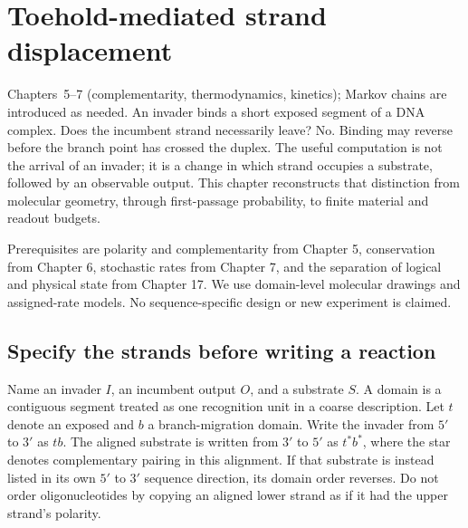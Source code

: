 \chapter{Toehold-mediated strand displacement}
{Chapters~5--7 (complementarity, thermodynamics, kinetics); Markov chains are introduced as needed.}
An invader binds a short exposed segment of a DNA complex. Does the incumbent
strand necessarily leave? No. Binding may reverse before the branch point has
crossed the duplex. The useful computation is not the arrival of an invader;
it is a change in which strand occupies a substrate, followed by an observable
output. This chapter reconstructs that distinction from molecular geometry,
through first-passage probability, to finite material and readout budgets.

Prerequisites are polarity and complementarity from Chapter 5, conservation
from Chapter 6, stochastic rates from Chapter 7, and the separation of logical
and physical state from Chapter 17. We use domain-level molecular drawings and
assigned-rate models. No sequence-specific design or new experiment is claimed.

\section{Specify the strands before writing a reaction}
Name an invader $I$, an incumbent output $O$, and a substrate $S$. A domain is
a contiguous segment treated as one recognition unit in a coarse description.
Let $t$ denote an exposed  and $b$ a branch-migration domain.
Write the invader from $5'$ to $3'$ as $tb$. The aligned substrate is written
from $3'$ to $5'$ as $t^*b^*$, where the star denotes complementary pairing
in this alignment. If that substrate is instead listed in its own $5'$ to
$3'$ sequence direction, its domain order reverses. Do not order oligonucleotides
by copying an aligned lower strand as if it had the upper strand's polarity.

